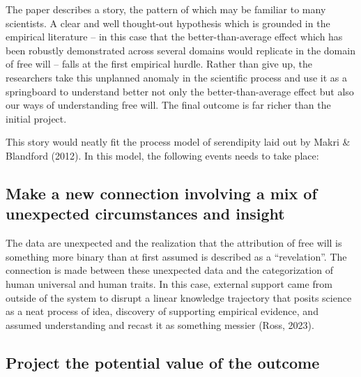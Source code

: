 \documentclass[authordate, commentary]{jote-new-article}
\author[1]{\mbox{Wendy Ross\orcid{0000-0002-0461-7660}}}
\affil[1]{London Metropolitan University}
\author[2]{\mbox{Stuart Firestein\orcid{0000-0003-1774-5853}}}
\affil[2]{Columbia University}
\begin{document}
\begin{frontmatter}
  \maketitle
  \begin{abstract}
    \printabstracttext
  \end{abstract}
\end{frontmatter}



	The paper describes a story, the pattern of which may be familiar to many scientists. A clear and well thought-out hypothesis which is grounded in the empirical literature -- in this case that the better-than-average effect which has been robustly demonstrated across several domains would replicate in the domain of free will -- falls at the first empirical hurdle. Rather than give up, the researchers take this unplanned anomaly in the scientific process and use it as a springboard to understand better not only the better-than-average effect but also our ways of understanding free will. The final outcome is far richer than the initial project.



	This story would neatly fit the process model of serendipity laid out by Makri \& Blandford (2012). In this model, the following events needs to take place:



	\subsection{Make a new connection involving a mix of unexpected circumstances and insight}



	The data are unexpected and the realization that the attribution of free will is something more binary than at first assumed is described as a “revelation”. The connection is made between these unexpected data and the categorization of human universal and human traits. In this case, external support came from outside of the system to disrupt a linear knowledge trajectory that posits science as a neat process of idea, discovery of supporting empirical evidence, and assumed understanding and recast it as something messier (Ross, 2023).



	\subsection{Project the potential value of the outcome}
\end{document}
